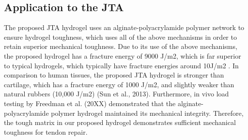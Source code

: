\subsection{Application to the JTA}
The proposed JTA hydrogel uses an alginate-polyacrylamide polymer network to ensure hydrogel toughness, which uses all of the above mechanisms in order to retain superior mechanical toughness. Due to its use of the above mechanisms, the proposed hydrogel has a fracture energy of 9000 J/m2, which is far superior to typical hydrogels, which typically have fracture energies around 10J/m2 . In comparison to human tissues, the proposed JTA hydrogel is stronger than cartilage, which has a fracture energy of 1000 J/m2, and slightly weaker than natural rubbers (10,000 J/m2) (Sun et al., 2013). Furthermore, in vivo load testing by Freedman et al. (20XX) demonstrated that the alginate-polyacrylamide polymer hydrogel maintained its mechanical integrity. Therefore, the tough matrix in our proposed hydrogel demonstrates sufficient mechanical toughness for tendon repair.
